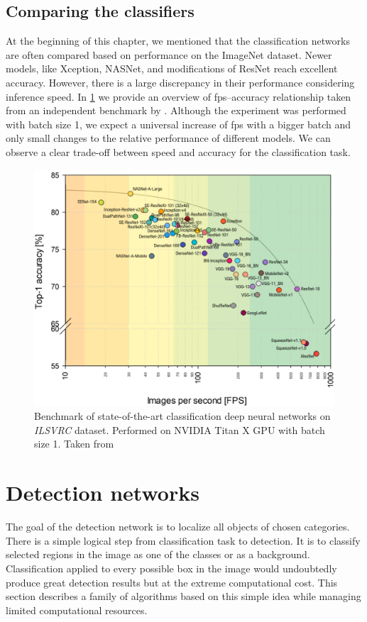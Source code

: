 \subsection{Comparing the classifiers}
\label{sec:cnncomp}
At the beginning of this chapter, we mentioned that the classification networks are often compared based on performance on the ImageNet dataset. Newer models, like Xception, NASNet, and modifications of ResNet reach excellent accuracy. However, there is a large discrepancy in their performance considering inference speed. In \cref{fig:cnnbenchmark} we provide an overview of fps--accuracy relationship taken from an independent benchmark by \citeauthor{bib:cnnbenchmark} \cite{bib:cnnbenchmark}. Although the experiment was performed with batch size 1, we expect a universal increase of fps with a bigger batch and only small changes to the relative performance of different models. We can observe a clear trade-off between speed and accuracy for the classification task.

\begin{figure}
    \includegraphics[width=\textwidth]{img/fps_comp}
    \caption[Benchmark of classification CNNs]%
    {Benchmark of state-of-the-art classification deep neural networks on \textit{ILSVRC} dataset. Performed on NVIDIA
Titan X GPU with batch size 1. Taken from \cite[fig. 3]{bib:cnnbenchmark}}
    \label{fig:cnnbenchmark}
\end{figure}



\section{Detection networks}
\label{sec:detnets}
The goal of the detection network is to localize all objects of chosen categories. There is a simple logical step from classification task to detection. It is to classify selected regions in the image as one of the classes or as a background. Classification applied to every possible box in the image would undoubtedly produce great detection results but at the extreme computational cost. This section describes a family of algorithms based on this simple idea while managing limited computational resources.

